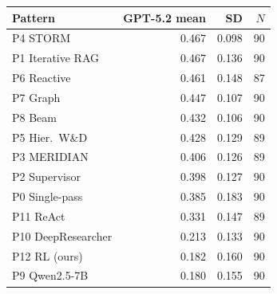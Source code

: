 \begin{tabular}{lrrr}
\toprule
Pattern & GPT-5.2 mean & SD & $N$\\
\midrule
P4 STORM & 0.467 & 0.098 & 90 \\
P1 Iterative RAG & 0.467 & 0.136 & 90 \\
P6 Reactive & 0.461 & 0.148 & 87 \\
P7 Graph & 0.447 & 0.107 & 90 \\
P8 Beam & 0.432 & 0.106 & 90 \\
P5 Hier.\ W\&D & 0.428 & 0.129 & 89 \\
P3 MERIDIAN & 0.406 & 0.126 & 89 \\
P2 Supervisor & 0.398 & 0.127 & 90 \\
P0 Single-pass & 0.385 & 0.183 & 90 \\
P11 ReAct & 0.331 & 0.147 & 89 \\
P10 DeepResearcher & 0.213 & 0.133 & 90 \\
P12 RL (ours) & 0.182 & 0.160 & 90 \\
P9 Qwen2.5-7B & 0.180 & 0.155 & 90 \\
\bottomrule
\end{tabular}